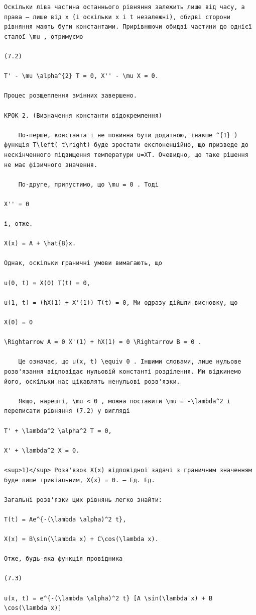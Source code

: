\documentclass[
  ukrainian,
]{article}
\begin{document}
\begin{verbatim}
Оскільки ліва частина останнього рівняння залежить лише від часу, а права — лише від x (і оскільки x і t незалежні), обидві сторони рівняння мають бути константами. Прирівнюючи обидві частини до однієї сталої \mu , отримуємо

(7.2)

T' - \mu \alpha^{2} T = 0, X'' - \mu X = 0.

Процес розщеплення змінних завершено.

КРОК 2. (Визначення константи відокремлення)

    По-перше, константа і не повинна бути додатною, інакше ^{1} ) функція T\left( t\right) буде зростати експоненційно, що призведе до нескінченного підвищення температури u=XT. Очевидно, що таке рішення не має фізичного значення.

    По-друге, припустимо, що \mu = 0 . Тоді

X'' = 0

і, отже.

X(x) = A + \hat{B}x.

Однак, оскільки граничні умови вимагають, що

u(0, t) = X(0) T(t) = 0,

u(1, t) = (hX(1) + X'(1)) T(t) = 0, Ми одразу дійшли висновку, що

X(0) = 0

\Rightarrow A = 0 X'(1) + hX(1) = 0 \Rightarrow B = 0 .

    Це означає, що u(x, t) \equiv 0 . Іншими словами, лише нульове розв'язання відповідає нульовій константі розділення. Ми відкинемо його, оскільки нас цікавлять ненульові розв'язки.

    Якщо, нарешті, \mu < 0 , можна поставити \mu = -\lambda^2 і переписати рівняння (7.2) у вигляді

T' + \lambda^2 \alpha^2 T = 0,

X' + \lambda^2 X = 0.

<sup>1)</sup> Розв'язок X(x) відповідної задачі з граничним значенням буде лише тривіальним, X(x) = 0. — Ед. Ед.

Загальні розв'язки цих рівнянь легко знайти:

T(t) = Ae^{-(\lambda \alpha)^2 t},

X(x) = B\sin(\lambda x) + C\cos(\lambda x).

Отже, будь-яка функція провідника

(7.3)

u(x, t) = e^{-(\lambda \alpha)^2 t} [A \sin(\lambda x) + B \cos(\lambda x)]


\end{verbatim}
\end{document}

